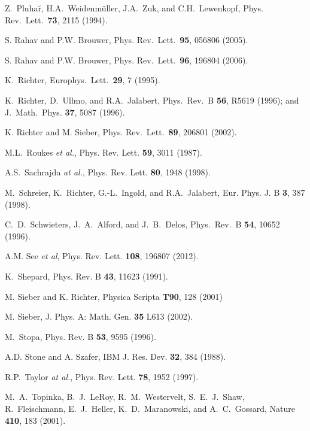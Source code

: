 \documentclass[a4paper,10pt]{article}
\newcommand{\etal}{\textit{et al.}}
\begin{document}
\begin{thebibliography}{Cucc~02b}
Z.~Pluha\u{r}, H.A.~Weidenm\"uller, J.A.~Zuk, and
C.H.~Lewenkopf, Phys. Rev.~Lett.~{\bf 73}, 2115 (1994).

 S. Rahav and P.W. Brouwer, Phys. Rev.~Lett.~{\bf 95}, 056806 (2005).

 S. Rahav and P.W. Brouwer, Phys. Rev.~Lett.~{\bf 96}, 196804 (2006).

K.~Richter, Europhys.~Lett.~{\bf 29}, 7 (1995).

 K.~Richter, D.~Ullmo, and R.A.~Jalabert,
Phys.~Rev.~B {\bf 56}, R5619 (1996); and J.~Math.~Phys. {\bf 37}, 5087 (1996).

 K. Richter and M. Sieber, Phys. Rev.~Lett.~{\bf 89}, 206801 (2002).

M.L.~Roukes {\em et al.}, Phys. Rev. Lett. {\bf 59}, 3011 (1987).

 A.S.~Sachrajda {\em at al.}, Phys. Rev. Lett. {\bf 80}, 
1948 (1998).

M.~Schreier, K.~Richter, G.-L.~Ingold, and R.A.~Jalabert,
Eur. Phys. J. B {\bf 3}, 387 (1998).

C.\ D.\ Schwieters, J.\ A.\ Alford, and J.\ B.\ Delos,
Phys.\ Rev.\ B {\bf 54}, 10652 (1996).

A.M. See {\em et al}, Phys. Rev. Lett. {\bf 108}, 
196807 (2012).

K.~Shepard, Phys. Rev. B {\bf 43}, 11623 (1991).

 M. Sieber and K. Richter, Physica Scripta {\bf T90}, 128 (2001)

 M. Sieber, J. Phys. A: Math. Gen. {\bf 35} L613 (2002).

M.~Stopa, Phys. Rev. B {\bf 53}, 9595 (1996).

A.D. Stone and A. Szafer, IBM J. Res. Dev. {\bf 32}, 384 (1988).

 R.P.~Taylor {\em at al.}, Phys. Rev. Lett. {\bf 78}, 1952 (1997).

M.\ A.\ Topinka, B.\ J.\ LeRoy, R.\ M.\ Westervelt, S.\ E.\ J.\ Shaw, R.\ Fleischmann, 
E.\ J.\ Heller, K.\ D.\ Maranowski, and A.\ C.\ Gossard,
Nature \textbf{410}, 183 (2001).


\end{thebibliography}
\end{document}
